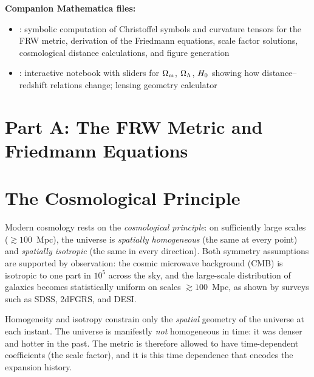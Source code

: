 \medskip
\noindent
\textbf{Companion Mathematica files:}
\begin{itemize}[nosep]
    \item {}:
          symbolic computation of Christoffel symbols and curvature
          tensors for the FRW metric, derivation of the Friedmann equations,
          scale factor solutions, cosmological distance calculations,
          and figure generation
    \item {}:
          interactive notebook with sliders for $\Omega_{\mathrm{m}}$,
          $\Omega_{\Lambda}$, $H_0$ showing how distance--redshift relations
          change; lensing geometry calculator
\end{itemize}



\section*{Part A: The FRW Metric and Friedmann Equations}

\section{The Cosmological Principle}
\label{sec:cosmological_principle}

Modern cosmology rests on the \emph{cosmological principle}: on
sufficiently large scales ($\gtrsim 100$~Mpc), the universe is
\emph{spatially homogeneous} (the same at every point) and
\emph{spatially isotropic} (the same in every direction).  Both
symmetry assumptions are supported by observation: the cosmic microwave
background (CMB) is isotropic to one part in $10^5$ across the sky, and
the large-scale distribution of galaxies becomes statistically uniform on
scales $\gtrsim 100$~Mpc, as shown by surveys such as SDSS, 2dFGRS, and
DESI.

\begin{remark}
Homogeneity and isotropy constrain only the \textit{spatial} geometry of
the universe at each instant.  The universe is manifestly \textit{not}
homogeneous in time: it was denser and hotter in the past.  The metric
is therefore allowed to have time-dependent coefficients (the scale
factor), and it is this time dependence that encodes the expansion
history.
\end{remark}

